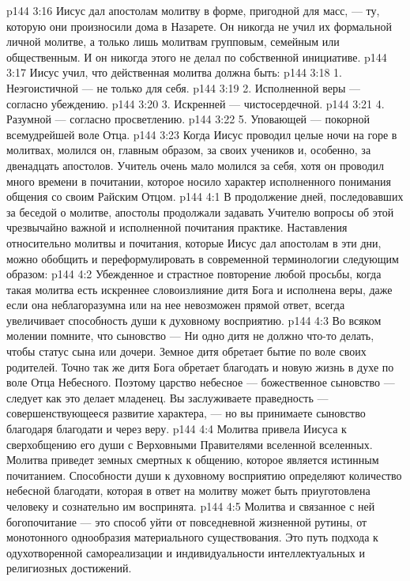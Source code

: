 \vs p144 3:16 Иисус дал апостолам молитву в форме, пригодной для масс, --- ту, которую они произносили дома в Назарете. Он никогда не учил их формальной личной молитве, а только лишь молитвам групповым, семейным или общественным. И он никогда этого не делал по собственной инициативе.
\vs p144 3:17 Иисус учил, что действенная молитва должна быть:
\vs p144 3:18 1. Неэгоистичной --- не только для себя.
\vs p144 3:19 2. Исполненной веры --- согласно убеждению.
\vs p144 3:20 3. Искренней --- чистосердечной.
\vs p144 3:21 4. Разумной --- согласно просветлению.
\vs p144 3:22 5. Уповающей --- покорной всемудрейшей воле Отца.
\vs p144 3:23 Когда Иисус проводил целые ночи на горе в молитвах, молился он, главным образом, за своих учеников и, особенно, за двенадцать апостолов. Учитель очень мало молился за себя, хотя он проводил много времени в почитании, которое носило характер исполненного понимания общения со своим Райским Отцом.
\vs p144 4:1 В продолжение дней, последовавших за беседой о молитве, апостолы продолжали задавать Учителю вопросы об этой чрезвычайно важной и исполненной почитания практике. Наставления относительно молитвы и почитания, которые Иисус дал апостолам в эти дни, можно обобщить и переформулировать в современной терминологии следующим образом:
\vs p144 4:2 Убежденное и страстное повторение любой просьбы, когда такая молитва есть искреннее словоизлияние дитя Бога и исполнена веры, даже если она неблагоразумна или на нее невозможен прямой ответ, всегда увеличивает способность души к духовному восприятию.
\vs p144 4:3 Во всяком молении помните, что сыновство ---  Ни одно дитя не должно что\hyp{}то делать, чтобы  статус сына или дочери. Земное дитя обретает бытие по воле своих родителей. Точно так же дитя Бога обретает благодать и новую жизнь в духе по воле Отца Небесного. Поэтому царство небесное --- божественное сыновство --- следует  как это делает младенец. Вы заслуживаете праведность --- совершенствующееся развитие характера, --- но вы принимаете сыновство благодаря благодати и через веру.
\vs p144 4:4 Молитва привела Иисуса к сверхобщению его души с Верховными Правителями вселенной вселенных. Молитва приведет земных смертных к общению, которое является истинным почитанием. Способности души к духовному восприятию определяют количество небесной благодати, которая в ответ на молитву может быть приуготовлена человеку и сознательно им воспринята.
\vs p144 4:5 Молитва и связанное с ней богопочитание --- это способ уйти от повседневной жизненной рутины, от монотонного однообразия материального существования. Это путь подхода к одухотворенной самореализации и индивидуальности интеллектуальных и религиозных достижений.
